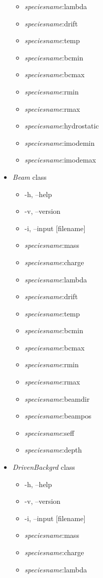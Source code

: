 \documentclass[10pt,a4paper]{article}
\begin{document}
\begin{itemize}
\begin{itemize}
	\item \emph{speciesname}:lambda	
	\item \emph{speciesname}:drift
	\item \emph{speciesname}:temp
	\item \emph{speciesname}:bcmin
	\item \emph{speciesname}:bcmax
	\item \emph{speciesname}:rmin
	\item \emph{speciesname}:rmax
	\item \emph{speciesname}:hydrostatic
	\item \emph{speciesname}:imodemin
	\item \emph{speciesname}:imodemax
	\end{itemize}
\item \emph{Beam} class
	\begin{itemize}
	\item -h, --help
	\item -v, --version
	\item -i, --input [filename]
	\item \emph{speciesname}:mass	
	\item \emph{speciesname}:charge	
	\item \emph{speciesname}:lambda	
	\item \emph{speciesname}:drift
	\item \emph{speciesname}:temp
	\item \emph{speciesname}:bcmin
	\item \emph{speciesname}:bcmax
	\item \emph{speciesname}:rmin
	\item \emph{speciesname}:rmax
	\item \emph{speciesname}:beamdir
	\item \emph{speciesname}:beampos
	\item \emph{speciesname}:seff
	\item \emph{speciesname}:depth
	\end{itemize}
\item \emph{DrivenBackgrd} class
	\begin{itemize}
	\item -h, --help
	\item -v, --version
	\item -i, --input [filename]
	\item \emph{speciesname}:mass	
	\item \emph{speciesname}:charge	
	\item \emph{speciesname}:lambda	

\end{itemize}
\end{itemize}
\end{document}
